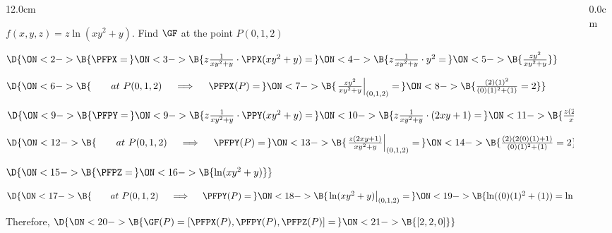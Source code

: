\begin{frame}
\frametitle{}
\scriptsize
\begin{columns}
\begin{column}{12.0cm}

\EX $f(x,y,z) = z\ln(xy^2 + y)$. \quad Find $\GF$ at the point $P(0,1,2)$

\vspace{0.2cm}

\SOL

\vspace{0.2cm}

$\D{\ON<2->{\B{\PFPX =\,}} 
\ON<3->{\B{z\frac{1}{xy^2 + y}\cdot \PPX(xy^2 + y) = \,}} 
\ON<4->{\B{z\frac{1}{xy^2 + y}\cdot y^2 =\,}} 
\ON<5->{\B{\frac{zy^2}{xy^2 + y}}}}$

\vspace{0.2cm}

$\D{\ON<6->{\B{\qquad at \,\, P(0,1,2) \quad \implies \quad \PFPX(P) = \,}}
\ON<7->{\B{\left.\frac{zy^2}{xy^2 + y}\right|_{(0,1,2)} = \,}}
\ON<8->{\B{\frac{(2)(1)^2}{(0)(1)^2 + (1)} = 2}}}$

\vspace{0.5cm}

$\D{\ON<9->{\B{\PFPY = \,}}
\ON<9->{\B{z\frac{1}{xy^2 + y}\cdot \PPY(xy^2 + y) = \,}}
\ON<10->{\B{z\frac{1}{xy^2 + y}\cdot (2xy+1) =\,}}
\ON<11->{\B{\frac{z(2xy+1)}{xy^2 + y}}}}$

\vspace{0.2cm}

$\D{\ON<12->{\B{\qquad at \,\, P(0,1,2) \quad \implies \quad \PFPY(P) = \,}}
\ON<13->{\B{\left.\frac{z(2xy+1)}{xy^2 + y}\right|_{(0,1,2)} =\,}}
\ON<14->{\B{\frac{(2)(2(0)(1)+1)}{(0)(1)^2 + (1)} = 2}}}$

\vspace{0.5cm}

$\D{\ON<15->{\B{\PFPZ = \,}}
\ON<16->{\B{\ln(xy^2 + y) }}}$

\vspace{0.2cm}

$\D{\ON<17->{\B{\qquad at \,\, P(0,1,2) \quad \implies \quad \PFPY(P) = \,}}
\ON<18->{\B{\left.\ln(xy^2 + y)\right|_{(0,1,2)} = \,}}
\ON<19->{\B{\ln((0)(1)^2 + (1)) = \ln(1) = 0}}}$

\vspace{0.5cm}

Therefore, \qquad $\D{\ON<20->{\B{\GF(P) = \left[\PFPX(P),\PFPY(P),\PFPZ(P)\right] = \,}}\ON<21->{\B{[2,2,0]}}}$
\vspace{4.2cm}


%
%

\vspace{4.2cm}

\end{column}
\begin{column}{0.0cm}\end{column}
\end{columns}
\end{frame}


